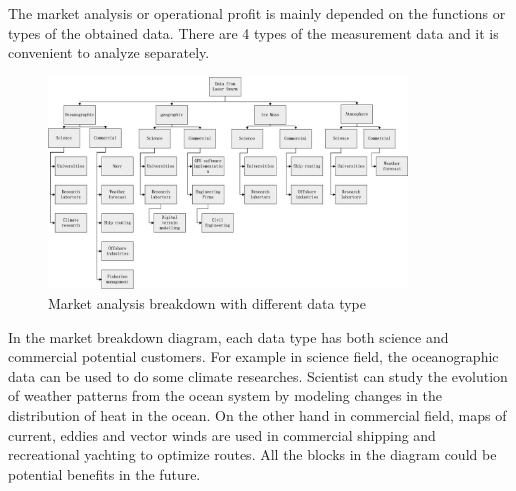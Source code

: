 The market analysis or operational profit is mainly depended on the functions or types of the obtained data. There are 4 types of the measurement data and it is convenient to analyze separately.
\begin{figure} [h]
	\begin{center}
 \includegraphics[width=0.85\textwidth,angle=0]{chapters/img/Market_analysis.jpg}	
	\caption{Market analysis breakdown with different data type\cite{Market}}
	\label{MA}
	\end{center}
\end{figure}
In the market breakdown diagram, each data type has both science and commercial potential customers. For example in science field, the oceanographic data can be used to do some climate researches. Scientist can study the evolution of weather patterns from the ocean system by modeling changes in the distribution of heat in the ocean. On the other hand in commercial field, maps of current, eddies and vector winds are used in commercial shipping and recreational yachting to optimize routes. All the blocks in the diagram could be potential benefits in the future.